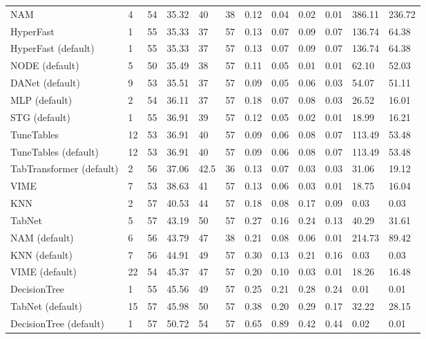 \begin{tabular}{lllllrllllll}
NAM & 4 & 54 & 35.32 & 40 & 38 & 0.12 & 0.04 & 0.02 & 0.01 & 386.11 & 236.72 \\
HyperFast & 1 & 55 & 35.33 & 37 & 57 & 0.13 & 0.07 & 0.09 & 0.07 & 136.74 & 64.38 \\
HyperFast (default) & 1 & 55 & 35.33 & 37 & 57 & 0.13 & 0.07 & 0.09 & 0.07 & 136.74 & 64.38 \\
NODE (default) & 5 & 50 & 35.49 & 38 & 57 & 0.11 & 0.05 & 0.01 & 0.01 & 62.10 & 52.03 \\
DANet (default) & 9 & 53 & 35.51 & 37 & 57 & 0.09 & 0.05 & 0.06 & 0.03 & 54.07 & 51.11 \\
MLP (default) & 2 & 54 & 36.11 & 37 & 57 & 0.18 & 0.07 & 0.08 & 0.03 & 26.52 & 16.01 \\
STG (default) & 1 & 55 & 36.91 & 39 & 57 & 0.12 & 0.05 & 0.02 & 0.01 & 18.99 & 16.21 \\
TuneTables & 12 & 53 & 36.91 & 40 & 57 & 0.09 & 0.06 & 0.08 & 0.07 & 113.49 & 53.48 \\
TuneTables (default) & 12 & 53 & 36.91 & 40 & 57 & 0.09 & 0.06 & 0.08 & 0.07 & 113.49 & 53.48 \\
TabTransformer (default) & 2 & 56 & 37.06 & 42.5 & 36 & 0.13 & 0.07 & 0.03 & 0.03 & 31.06 & 19.12 \\
VIME & 7 & 53 & 38.63 & 41 & 57 & 0.13 & 0.06 & 0.03 & 0.01 & 18.75 & 16.04 \\
KNN & 2 & 57 & 40.53 & 44 & 57 & 0.18 & 0.08 & 0.17 & 0.09 & 0.03 & 0.03 \\
TabNet & 5 & 57 & 43.19 & 50 & 57 & 0.27 & 0.16 & 0.24 & 0.13 & 40.29 & 31.61 \\
NAM (default) & 6 & 56 & 43.79 & 47 & 38 & 0.21 & 0.08 & 0.06 & 0.01 & 214.73 & 89.42 \\
KNN (default) & 7 & 56 & 44.91 & 49 & 57 & 0.30 & 0.13 & 0.21 & 0.16 & 0.03 & 0.03 \\
VIME (default) & 22 & 54 & 45.37 & 47 & 57 & 0.20 & 0.10 & 0.03 & 0.01 & 18.26 & 16.48 \\
DecisionTree & 1 & 55 & 45.56 & 49 & 57 & 0.25 & 0.21 & 0.28 & 0.24 & 0.01 & 0.01 \\
TabNet (default) & 15 & 57 & 45.98 & 50 & 57 & 0.38 & 0.20 & 0.29 & 0.17 & 32.22 & 28.15 \\
DecisionTree (default) & 1 & 57 & 50.72 & 54 & 57 & 0.65 & 0.89 & 0.42 & 0.44 & 0.02 & 0.01 \\
\bottomrule
\end{tabular}
